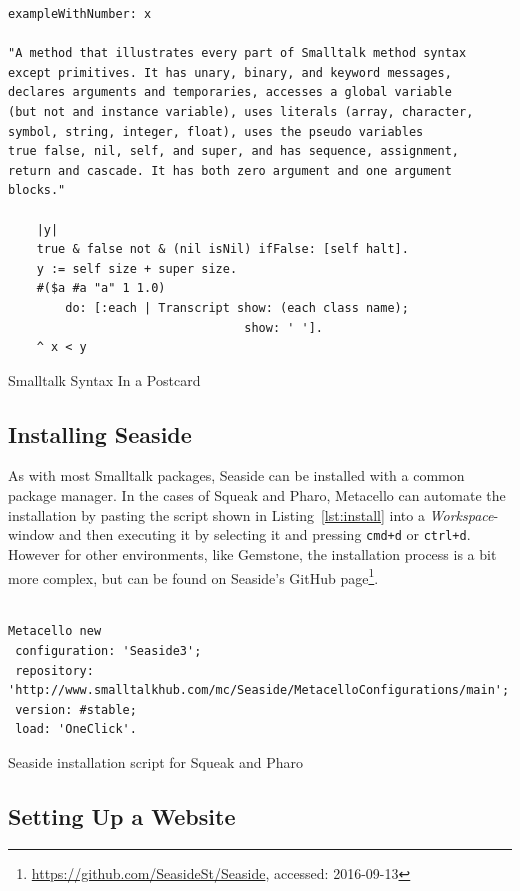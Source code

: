 \documentclass[a4paper,12pt,pagesize,headsepline,titlepage]{scrartcl}
\begin{document}
\begin{listing}[]%
\begin{verbatim}
exampleWithNumber: x

"A method that illustrates every part of Smalltalk method syntax
except primitives. It has unary, binary, and keyword messages,
declares arguments and temporaries, accesses a global variable
(but not and instance variable), uses literals (array, character,
symbol, string, integer, float), uses the pseudo variables
true false, nil, self, and super, and has sequence, assignment,
return and cascade. It has both zero argument and one argument blocks."	

    |y|
    true & false not & (nil isNil) ifFalse: [self halt].
    y := self size + super size.
    #($a #a "a" 1 1.0)
        do: [:each | Transcript show: (each class name);
                                 show: ' '].
    ^ x < y
\end{verbatim}
\caption{Smalltalk Syntax In a Postcard}
\label{fig:syntax}
\end{listing}


\subsection{Installing Seaside}

As with most Smalltalk packages, Seaside can be installed with a common package manager. In the cases of Squeak and Pharo, Metacello can automate the installation by pasting the script shown in Listing~\ref{lst:install} into a \emph{Workspace}-window and then executing it by selecting it and pressing \texttt{cmd+d} or \texttt{ctrl+d}. However for other environments, like Gemstone, the installation process is a bit more complex, but can be found on Seaside's GitHub page\footnote{\url{https://github.com/SeasideSt/Seaside}, accessed: 2016-09-13}.

\begin{listing}[]%
\begin{verbatim}

Metacello new
 configuration: 'Seaside3';
 repository: 'http://www.smalltalkhub.com/mc/Seaside/MetacelloConfigurations/main';
 version: #stable;
 load: 'OneClick'.

\end{verbatim}
\caption{Seaside installation script for Squeak and Pharo}
\label{lst:install}
\end{listing}

\subsection{Setting Up a Website}
\end{document}
